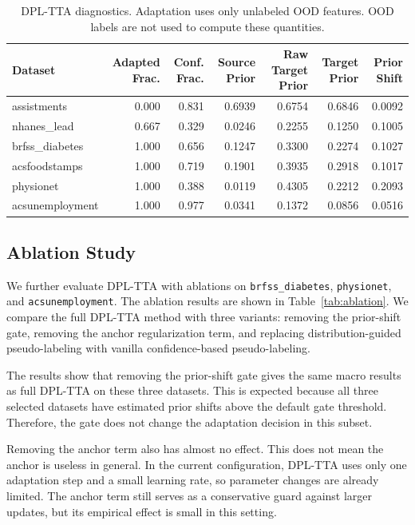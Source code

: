 \begin{table}[t]
\centering
\caption{DPL-TTA diagnostics. Adaptation uses only unlabeled OOD features. OOD labels are not used to compute these quantities.}
\label{tab:dpl_diagnostics}
\begin{tabular}{lrrrrrr}
\toprule
Dataset & Adapted Frac. & Conf. Frac. & Source Prior & Raw Target Prior & Target Prior & Prior Shift \\
\midrule
assistments     & 0.000 & 0.831 & 0.6939 & 0.6754 & 0.6846 & 0.0092 \\
nhanes\_lead    & 0.667 & 0.329 & 0.0246 & 0.2255 & 0.1250 & 0.1005 \\
brfss\_diabetes & 1.000 & 0.656 & 0.1247 & 0.3300 & 0.2274 & 0.1027 \\
acsfoodstamps   & 1.000 & 0.719 & 0.1901 & 0.3935 & 0.2918 & 0.1017 \\
physionet       & 1.000 & 0.388 & 0.0119 & 0.4305 & 0.2212 & 0.2093 \\
acsunemployment & 1.000 & 0.977 & 0.0341 & 0.1372 & 0.0856 & 0.0516 \\
\bottomrule
\end{tabular}
\end{table}

\subsection{Ablation Study}

We further evaluate DPL-TTA with ablations on \texttt{brfss\_diabetes}, \texttt{physionet}, and \texttt{acsunemployment}. The ablation results are shown in Table~\ref{tab:ablation}. We compare the full DPL-TTA method with three variants: removing the prior-shift gate, removing the anchor regularization term, and replacing distribution-guided pseudo-labeling with vanilla confidence-based pseudo-labeling.

The results show that removing the prior-shift gate gives the same macro results as full DPL-TTA on these three datasets. This is expected because all three selected datasets have estimated prior shifts above the default gate threshold. Therefore, the gate does not change the adaptation decision in this subset.

Removing the anchor term also has almost no effect. This does not mean the anchor is useless in general. In the current configuration, DPL-TTA uses only one adaptation step and a small learning rate, so parameter changes are already limited. The anchor term still serves as a conservative guard against larger updates, but its empirical effect is small in this setting.

